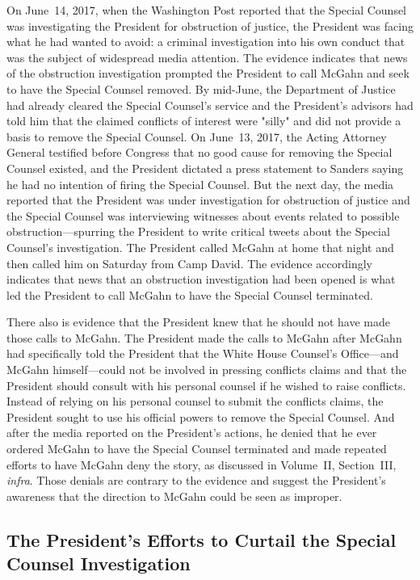 On June~14, 2017, when the Washington Post reported that the Special Counsel was investigating the President for obstruction of justice, the President was facing what he had wanted to avoid: a criminal investigation into his own conduct that was the subject of widespread media attention.
The evidence indicates that news of the obstruction investigation prompted the President to call McGahn and seek to have the Special Counsel removed.
By mid-June, the Department of Justice had already cleared the Special Counsel's service and the President's advisors had told him that the claimed conflicts of interest were "silly" and did not provide a basis to remove the Special Counsel.
On June~13, 2017, the Acting Attorney General testified before Congress that no good cause for removing the Special Counsel existed, and the President dictated a press statement to Sanders saying he had no intention of firing the Special Counsel.
But the next day, the media reported that the President was under investigation for obstruction of justice and the Special Counsel was interviewing witnesses about events related to possible obstruction---spurring the President to write critical tweets about the Special Counsel's investigation.
The President called McGahn at home that night and then called him on Saturday from Camp David.
The evidence accordingly indicates that news that an obstruction investigation had been opened is what led the President to call McGahn to have the Special Counsel terminated.

There also is evidence that the President knew that he should not have made those calls to McGahn.
The President made the calls to McGahn after McGahn had specifically told the President that the White House Counsel's Office---and McGahn himself---could not be involved in pressing conflicts claims and that the President should consult with his personal counsel if he wished to raise conflicts.
Instead of relying on his personal counsel to submit the conflicts claims, the President sought to use his official powers to remove the Special Counsel.
And after the media reported on the President's actions, he denied that he ever ordered McGahn to have the Special Counsel terminated and made repeated efforts to have McGahn deny the story, as discussed in Volume~II, Section~III, \textit{infra}.
Those denials are contrary to the evidence and suggest the President's awareness that the direction to McGahn could be seen as improper.

\subsection{The President's Efforts to Curtail the Special Counsel Investigation}

